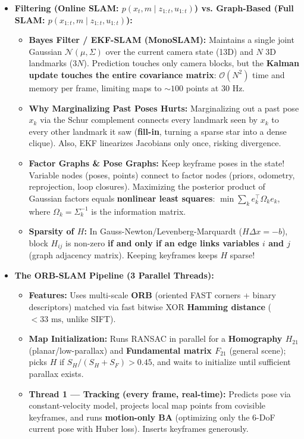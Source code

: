 \documentclass[10pt, a4paper]{article}
\begin{document}
\begin{itemize}
    \item \textbf{Filtering (Online SLAM: $p(x_t, m \mid z_{1:t}, u_{1:t})$) vs. Graph-Based (Full SLAM: $p(x_{1:t}, m \mid z_{1:t}, u_{1:t})$):}
    \begin{itemize}
        \item \textbf{Bayes Filter / EKF-SLAM (MonoSLAM):} Maintains a single joint Gaussian $\mathcal{N}(\mu, \Sigma)$ over the current camera state (13D) and $N$ 3D landmarks ($3N$). Prediction touches only camera blocks, but the \textbf{Kalman update touches the entire covariance matrix}: $\mathcal{O}(N^2)$ time and memory per frame, limiting maps to $\sim 100$ points at 30 Hz.
        \item \textbf{Why Marginalizing Past Poses Hurts:} Marginalizing out a past pose $x_k$ via the Schur complement connects every landmark seen by $x_k$ to every other landmark it saw (\textbf{fill-in}, turning a sparse star into a dense clique). Also, EKF linearizes Jacobians only once, risking divergence.
        \item \textbf{Factor Graphs \& Pose Graphs:} Keep keyframe poses in the state! Variable nodes (poses, points) connect to factor nodes (priors, odometry, reprojection, loop closures). Maximizing the posterior product of Gaussian factors equals \textbf{nonlinear least squares}: $\min \sum_k e_k^\top \Omega_k e_k$, where $\Omega_k = \Sigma_k^{-1}$ is the information matrix.
        \item \textbf{Sparsity of $H$:} In Gauss-Newton/Levenberg-Marquardt ($H\Delta x = -b$), block $H_{ij}$ is non-zero \textbf{if and only if an edge links variables $i$ and $j$} (graph adjacency matrix). Keeping keyframes keeps $H$ sparse!
    \end{itemize}
    \item \textbf{The ORB-SLAM Pipeline (3 Parallel Threads):}
    \begin{itemize}
        \item \textbf{Features:} Uses multi-scale \textbf{ORB} (oriented FAST corners + binary descriptors) matched via fast bitwise XOR \textbf{Hamming distance} ($<33\text{ ms}$, unlike SIFT).
        \item \textbf{Map Initialization:} Runs RANSAC in parallel for a \textbf{Homography $H_{21}$} (planar/low-parallax) and \textbf{Fundamental matrix $F_{21}$} (general scene); picks $H$ if $S_H/(S_H+S_F) > 0.45$, and waits to initialize until sufficient parallax exists.
        \item \textbf{Thread 1 --- Tracking (every frame, real-time):} Predicts pose via constant-velocity model, projects local map points from covisible keyframes, and runs \textbf{motion-only BA} (optimizing only the 6-DoF current pose with Huber loss). Inserts keyframes generously.

\end{itemize}
\end{itemize}
\end{document}
